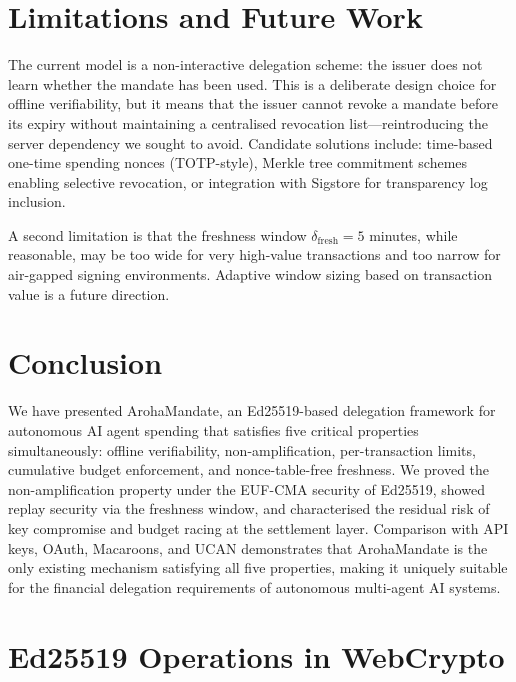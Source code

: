 \documentclass[conference]{IEEEtran}
\begin{document}
\section{Limitations and Future Work}
\label{sec:limits}

The current model is a non-interactive delegation scheme:
the issuer does not learn whether the mandate has been
used. This is a deliberate design choice for offline
verifiability, but it means that the issuer cannot revoke
a mandate before its expiry without maintaining a
centralised revocation list—reintroducing the server
dependency we sought to avoid. Candidate solutions include:
time-based one-time spending nonces (TOTP-style), Merkle
tree commitment schemes enabling selective revocation, or
integration with Sigstore \cite{sigstore2021} for
transparency log inclusion.

A second limitation is that the freshness window
$\delta_{\text{fresh}} = 5$ minutes, while reasonable, may
be too wide for very high-value transactions and too narrow
for air-gapped signing environments. Adaptive window sizing
based on transaction value is a future direction.

\section{Conclusion}
\label{sec:conclusion}

We have presented ArohaMandate, an Ed25519-based delegation
framework for autonomous AI agent spending that satisfies five
critical properties simultaneously: offline verifiability,
non-amplification, per-transaction limits, cumulative budget
enforcement, and nonce-table-free freshness.  We proved the
non-amplification property under the EUF-CMA security of
Ed25519, showed replay security via the freshness window, and
characterised the residual risk of key compromise and budget
racing at the settlement layer.  Comparison with API keys,
OAuth, Macaroons, and UCAN demonstrates that ArohaMandate
is the only existing mechanism satisfying all five properties,
making it uniquely suitable for the financial delegation
requirements of autonomous multi-agent AI systems.




\appendix

\section{Ed25519 Operations in WebCrypto}
\label{app:webcrypto}
\end{document}
